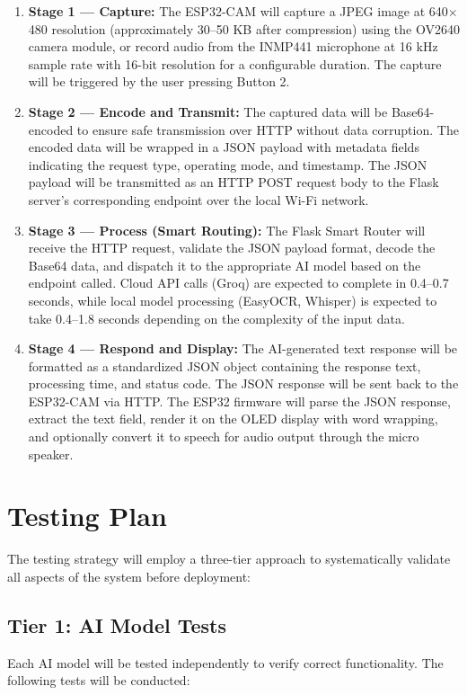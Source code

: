 \begin{enumerate}[leftmargin=1.5cm]
\item \textbf{Stage 1 --- Capture:} The ESP32-CAM will capture a JPEG image at 640$\times$480 resolution (approximately 30--50 KB after compression) using the OV2640 camera module, or record audio from the INMP441 microphone at 16 kHz sample rate with 16-bit resolution for a configurable duration. The capture will be triggered by the user pressing Button 2.

\item \textbf{Stage 2 --- Encode and Transmit:} The captured data will be Base64-encoded to ensure safe transmission over HTTP without data corruption. The encoded data will be wrapped in a JSON payload with metadata fields indicating the request type, operating mode, and timestamp. The JSON payload will be transmitted as an HTTP POST request body to the Flask server's corresponding endpoint over the local Wi-Fi network.

\item \textbf{Stage 3 --- Process (Smart Routing):} The Flask Smart Router will receive the HTTP request, validate the JSON payload format, decode the Base64 data, and dispatch it to the appropriate AI model based on the endpoint called. Cloud API calls (Groq) are expected to complete in 0.4--0.7 seconds, while local model processing (EasyOCR, Whisper) is expected to take 0.4--1.8 seconds depending on the complexity of the input data.

\item \textbf{Stage 4 --- Respond and Display:} The AI-generated text response will be formatted as a standardized JSON object containing the response text, processing time, and status code. The JSON response will be sent back to the ESP32-CAM via HTTP. The ESP32 firmware will parse the JSON response, extract the text field, render it on the OLED display with word wrapping, and optionally convert it to speech for audio output through the micro speaker.
\end{enumerate}

\section{Testing Plan}
The testing strategy will employ a three-tier approach to systematically validate all aspects of the system before deployment:

\subsection{Tier 1: AI Model Tests}
Each AI model will be tested independently to verify correct functionality. The following tests will be conducted:

